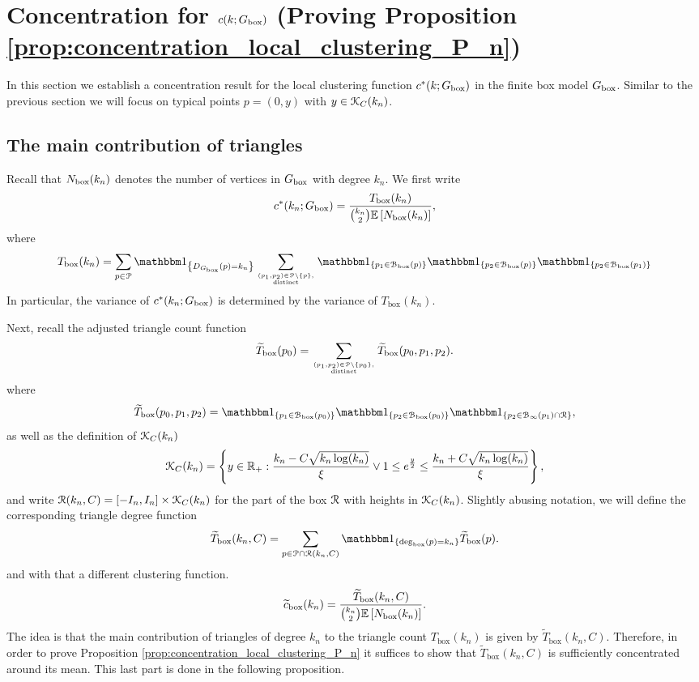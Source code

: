 \section{Concentration for $c(k; G_{\mathrm{box}})$ (Proving Proposition \ref{prop:concentration_local_clustering_P_n})}
\label{sec:concentration_c_P_n}

In this section we establish a concentration result for the local clustering function $c^\ast(k; G_{\mathrm{box}})$ in the finite box model $G_{\mathrm{box}}$. Similar to the previous section we will focus on typical points $p = (0,y)$ with $y \in {\mathcal K}_{C}(k_n)$. 

\subsection{The main contribution of triangles}

Recall that $N_{\text{box}}(k_n)$ denotes the number of vertices in $G_{\mathrm{box}}$ with degree $k_n$. We first write
\[
	c^\ast(k_n ; G_{\mathrm{box}}) = \frac{T_{\text{box}}(k_n)}{\binom{k_n}{2}\mathbb{E}\left[N_{\text{box}}(k_n)\right]},
\]
where
\[
	 T_{\text{box}}(k_n) = \sum_{p \in \Pcal} \ind{\Dbox(p) = k_n} \sum_{(p_1, p_2) \in \Pcal \setminus \{p\}, \atop \text{distinct}} 
	 \ind{p_1 \in \BallPon{p}}\ind{p_2 \in \BallPon{p}}\ind{p_2 \in \BallPon{p_1}}
\]
In particular, the variance of $c^\ast(k_n ; G_{\mathrm{box}})$ is determined by the variance of $T_{\text{box}}(k_n)$.

Next, recall the adjusted triangle count function
\[
	\widetilde{T}_{\text{box}}(p_0) = \sum_{(p_1, p_2) \in {\mathcal P} \setminus \{p_0\}, \atop \text{distinct}}
		\widetilde{T}_{\text{box}}(p_0,p_1,p_2).
\]
where
\[
	\widetilde{T}_{\text{box}}(p_0,p_1,p_2) = \ind{p_1 \in \BallPon{p_0}}\ind{p_2 \in \BallPon{p_0}}\ind{p_2 \in \BallPo{p_1} \cap \Rcal},
\]
as well as the definition of ${\mathcal K}_{C}(k_n)$
\[
	{\mathcal K}_{C}(k_n) = \left\{y \in {\ensuremath{\mathbb R}}_+ : \frac{k_n - C \sqrt{k_n \log(k_n)}}{\xi} \vee 1 \le e^{\frac{y}{2}}
		\le \frac{k_n + C \sqrt{k_n \log(k_n)}}{\xi} \right\},
\]
and write ${\mathcal R}(k_n,C) = [-I_n,I_n] \times {\mathcal K}_{C}(k_n)$ for the part of the box ${\mathcal R}$ with heights in ${\mathcal K}_{C}(k_n)$.
Slightly abusing notation, we will define the corresponding triangle degree function
\begin{equation}\label{eq:def_degree_triangle_count_in_K}
	\widetilde{T}_{\text{box}}(k_n, C) = \sum_{p \in \Pcal \cap \Rcal(k_n,C)} \ind{\text{deg}_{\text{box}}(p) = k_n} \widetilde{T}_{\text{box}}(p).
\end{equation}
and with that a different clustering function.
\begin{equation}\label{eq:def_tilde_c_box}
	\widetilde{c}_{\text{box}}(k_n) = \frac{\widetilde{T}_{\text{box}}(k_n,C)}{\binom{k_n}{2}\mathbb{E}\left[N_{\text{box}}(k_n)\right]}.
\end{equation}
The idea is that the main contribution of triangles of degree $k_n$ to the triangle count $T_{\text{box}}(k_n)$ is given by $\widetilde{T}_{\text{box}}(k_n, C)$. Therefore, in order to prove Proposition \ref{prop:concentration_local_clustering_P_n} it suffices to show that $\widetilde{T}_{\text{box}}(k_n,C)$ is sufficiently concentrated around its mean. This last part is done in the following proposition.

